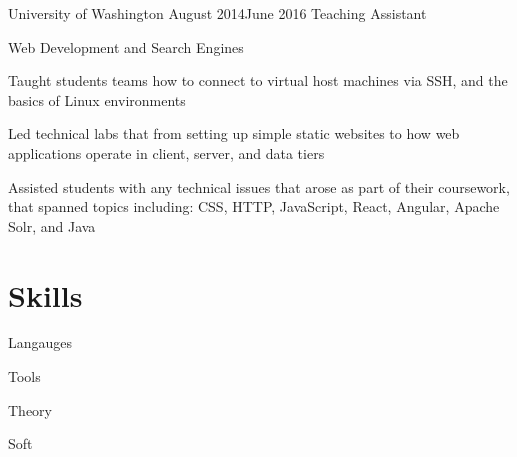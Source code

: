 \documentclass[]{resume}
\begin{document}
\begin{employer}[logos/uw]{University of Washington} {August 2014}{June 2016}
  {Teaching Assistant}
  \begin{team}{Web Development and Search Engines}
  \begin{bullets}
  \item Taught students teams
    how to connect to
    virtual host machines via SSH,
    and the basics of Linux environments
  \item Led technical labs that from
    setting up simple static websites
    to how web applications operate
    in client, server, and data tiers
  \item Assisted students with any technical issues
    that arose as part of their coursework,
    that spanned topics including:
    CSS,
    HTTP,
    JavaScript,
    React,
    Angular,
    Apache Solr,
    and
    Java
  \end{bullets}
  \end{team}
\end{employer}

\newcolumn


\section{Skills}

\begin{skilltable}{Langauges}
\end{skilltable}

\begin{skilltable}{Tools}
\end{skilltable}

\begin{skilltable}{Theory}
\end{skilltable}

\begin{skilltable}{Soft}
\end{skilltable}
    
\end{document}
